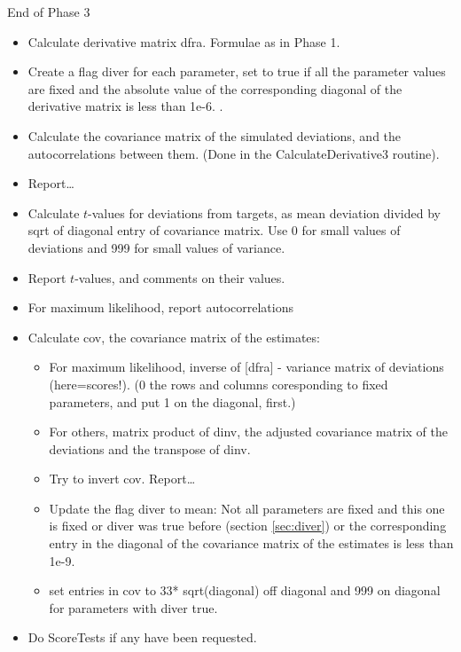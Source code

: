 \documentclass[12pt,a4paper]{article}
\makeatletter
\renewcommand{\=}{\,=\,}
\newcommand{\+}{\,+\,}
\newcommand{\nm}[1]{\textsf{ #1}}
\renewcommand{\subsubsection}{\@startsection{subsubsection}{3}
                {0pt}{0.5\baselineskip}{0.3\baselineskip}
                {\it\sffamily} }
\makeatother
\begin{document}
\subsubsection{End of Phase 3}
\begin{itemize}
\item
Calculate derivative matrix \nm{dfra}. Formulae as in Phase 1.
\item
Create a flag \nm{diver} for each parameter, set to true if all the
parameter values are fixed and the absolute value of the corresponding
diagonal of the derivative matrix is less than 1e-6. \label{sec:diver}.
\item
Calculate the covariance matrix of the simulated deviations, and
the autocorrelations between them. (Done in the CalculateDerivative3
routine).
\item
Report\ldots
\item Calculate $t$-values for deviations from targets, as mean
  deviation divided by sqrt of diagonal entry of covariance
  matrix. Use 0 for small values of deviations and 999 for small
  values of variance.
\item
Report $t$-values, and comments on their values.
\item For maximum likelihood, report autocorrelations
\item Calculate \nm{cov}, the covariance matrix of the estimates:
\begin{itemize}
\item For maximum likelihood, inverse of \nm[dfra] - variance matrix of
  deviations (here=scores!). (0 the rows and columns coresponding to
  fixed parameters, and put 1 on the diagonal, first.)
\item For others, matrix product of \nm{dinv}, the adjusted covariance
  matrix of the deviations and the transpose of \nm{dinv}.
\item Try to invert \nm{cov}. Report\ldots
\item Update the flag \nm{diver} to mean: Not all parameters are fixed
  and this one is fixed or \nm{diver} was true before (section
  \ref{sec:diver}) or the corresponding entry in the diagonal of the
  covariance matrix of the estimates is less than 1e-9. \label{sec:diver2}
\item
  set entries in \nm{cov} to 33* sqrt(diagonal) off diagonal and 999
  on diagonal for parameters with \nm{diver} true.
\end{itemize}
\item Do ScoreTests if any have been requested.
\end{itemize}
\end{document}
